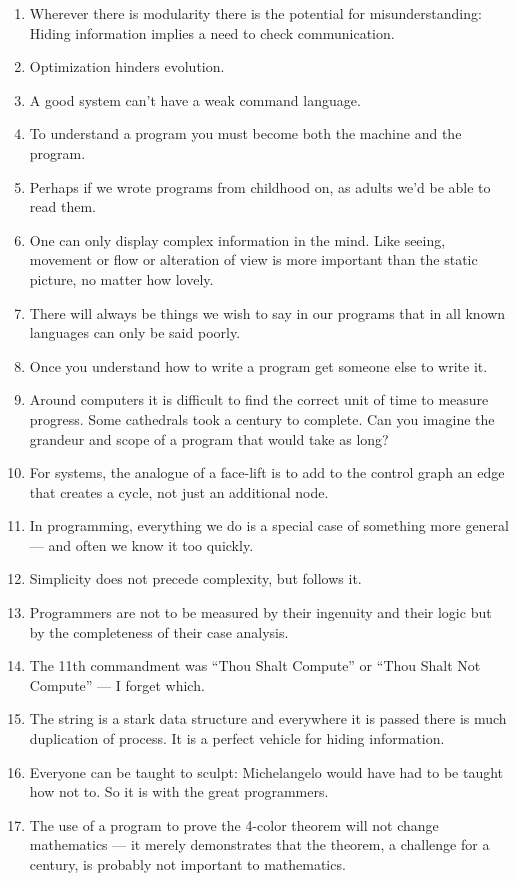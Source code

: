 \documentclass[letterpaper,11pt]{article}
\begin{document}
\begin{multicols}{2}
\begin{enumerate}[wide=0pt,label=\textbf{\arabic*.}]
\item Wherever there is modularity there is the potential for misunderstanding: Hiding information implies a need to check communication.
\item Optimization hinders evolution.
\item A good system can't have a weak command language.
\item To understand a program you must become both the machine and the program.
\item Perhaps if we wrote programs from childhood on, as adults we'd be able to read them.
\item One can only display complex information in the mind. Like seeing, movement or flow or alteration of view is more important than the static picture, no matter how lovely.
\item There will always be things we wish to say in our programs that in all known languages can only be said poorly.
\item Once you understand how to write a program get someone else to write it.
\item Around computers it is difficult to find the correct unit of time to measure progress. Some cathedrals took a century to complete. Can you imagine the grandeur and scope of a program that would take as long?
\item For systems, the analogue of a face-lift is to add to the control graph an edge that creates a cycle, not just an additional node.
\item In programming, everything we do is a special case of something more general --- and often we know it too quickly.
\item Simplicity does not precede complexity, but follows it.
\item Programmers are not to be measured by their ingenuity and their logic but by the completeness of their case analysis.
\item The 11th commandment was ``Thou Shalt Compute'' or ``Thou Shalt Not Compute'' --- I forget which.
\item The string is a stark data structure and everywhere it is passed there is much duplication of process. It is a perfect vehicle for hiding information.
\item Everyone can be taught to sculpt: Michelangelo would have had to be taught how not to. So it is with the great programmers.
\item The use of a program to prove the 4-color theorem will not change mathematics --- it merely demonstrates that the theorem, a challenge for a century, is probably not important to mathematics.

\end{enumerate}
\end{multicols}
\end{document}
